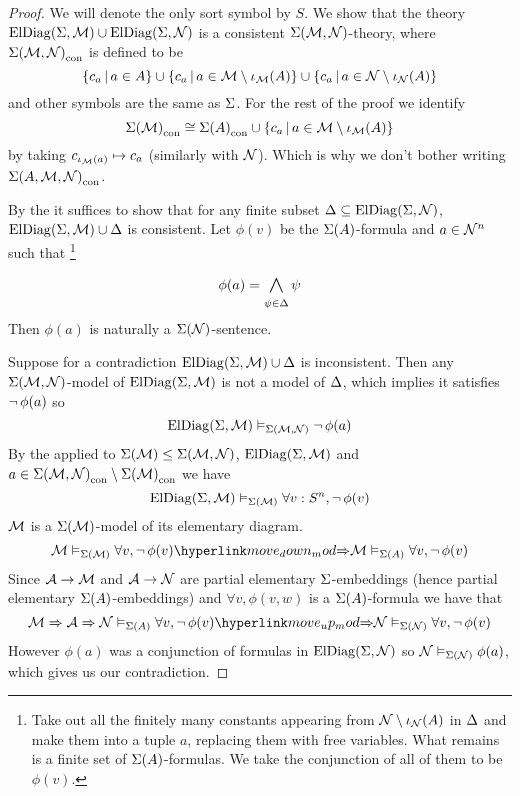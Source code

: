 \begin{proof}
    We will denote the only sort symbol by $S$.
    We show that the theory $\mathrm{ElDiag}(\Sigma,\mathcal{M}) \cup \mathrm{ElDiag}(\Sigma,\mathcal{N})$
    is a consistent $\Sigma(\mathcal{M},\mathcal{N})$-theory, where ${\Sigma(\mathcal{M},\mathcal{N})}_\mathrm{con}$ is 
    defined to be 
    \[
        \left\{c_a \,|\, a \in A\right\} \cup 
        \left\{c_a \,|\, a \in \mathcal{M} \setminus \iota_{\mathcal{M}}(A)\right\}
        \cup \left\{c_a \,|\, a \in \mathcal{N} \setminus \iota_{\mathcal{N}}(A)\right\}
    \]
    and other symbols are the same as $\Sigma$.
    For the rest of the proof we identify 
    \[
        {\Sigma(\mathcal{M})}_\mathrm{con} \cong 
        {\Sigma(A)}_\mathrm{con} \cup \left\{c_a \,|\, a \in \mathcal{M} \setminus \iota_{\mathcal{M}}(A)\right\}
    \]
    by taking $c_{\iota_{\mathcal{M}}(a)} \mapsto c_a$
    (similarly with $\mathcal{N}$). 
    Which is why we don't bother writing ${\Sigma(A,\mathcal{M},\mathcal{N})}_\mathrm{con}$.

    By the  it suffices to show that 
    for any finite subset $\Delta \subseteq \mathrm{ElDiag}(\Sigma,\mathcal{N})$,
    $\mathrm{ElDiag}(\Sigma,\mathcal{M}) \cup \Delta$ is consistent.
    Let $\phi(v)$ be the $\Sigma(A)$-formula and $a \in \mathcal{N}^n$ such 
    that \footnote{Take out all the finitely many constants appearing from 
        $\mathcal{N} \setminus \iota_{\mathcal{N}}(A)$ in 
        $\Delta$ and make them into a tuple $a$, 
        replacing them with free variables.
        What remains is a finite set of $\Sigma(A)$-formulas. 
        We take the conjunction of all of them to be $\phi(v)$.}
    \[
        \phi(a) = \bigand{\psi \in \De}{} \psi
    \]
    Then $\phi(a)$ is naturally a $\Sigma(\mathcal{N})$-sentence.
    
    Suppose for a contradiction $\mathrm{ElDiag}(\Sigma,\mathcal{M}) \cup \Delta$ is inconsistent.
    Then any $\Sigma(\mathcal{M},\mathcal{N})$-model of 
    $\mathrm{ElDiag}(\Sigma,\mathcal{M})$ is not a model of $\Delta$,
    which implies it satisfies $\neg\, \phi(a)$ so
    \[\mathrm{ElDiag}(\Sigma,\mathcal{M}) \vDash_{\Sigma(\mathcal{M},\mathcal{N})} \neg\, \phi(a)\]
    By the  applied to 
    $\Sigma(\mathcal{M}) \leq \Sigma(\mathcal{M},\mathcal{N})$, $\mathrm{ElDiag}(\Sigma,\mathcal{M})$ and 
    $a \in {\Sigma(\mathcal{M},\mathcal{N})}_\mathrm{con} \setminus {\Sigma(\mathcal{M})}_\mathrm{con}$ we have
    \[
        \mathrm{ElDiag}(\Sigma,\mathcal{M}) \vDash_{\Sigma(\mathcal{M})} \forall v : S^n, \neg\, \phi(v)
    \]
    $\mathcal{M}$ is a $\Sigma(\mathcal{M})$-model of its elementary diagram.
    \[
        \MM \model{\Si(\MM)} \forall v, \NOT \phi(v) 
        \linkto{move_down_mod}{\implies} 
        \MM \model{\Si(A)} \forall v, \NOT \phi(v) 
    \]
    Since $\mathcal{A} \to \mathcal{M}$ and $\mathcal{A} \to \mathcal{N}$ are partial elementary 
    $\Sigma$-embeddings (hence partial elementary $\Sigma(A)$-embeddings)
    and $\forall v, \phi(v,w)$ is a $\Sigma(A)$-formula we have that 
    \[
        \MM \implies \AA \implies 
        \NN \model{\Si(A)} \forall v, \NOT \phi(v)
        \linkto{move_up_mod}{\implies} 
        \NN \model{\Si(\NN)} \forall v, \NOT \phi(v)
    \]
    However $\phi(a)$ was a conjunction of formulas in $\mathrm{ElDiag}(\Sigma,\mathcal{N})$
    so $\mathcal{N} \vDash_{\Sigma(\mathcal{N})} \phi(a)$, which gives us our contradiction.


\end{proof}
